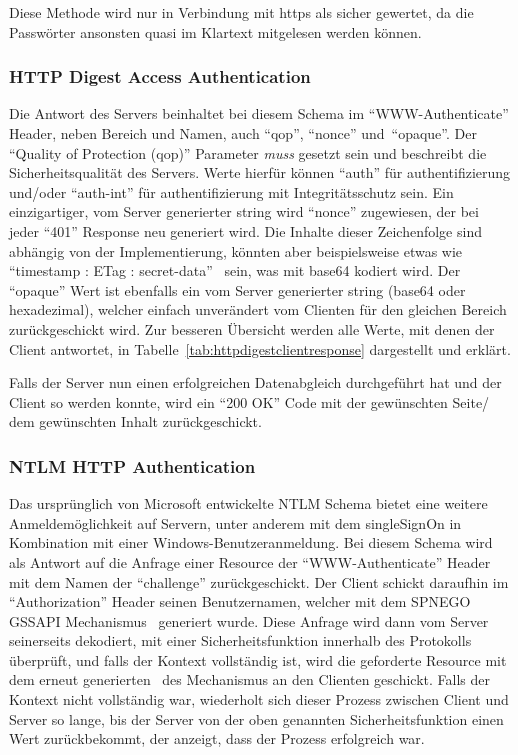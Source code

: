		Diese Methode wird nur in Verbindung mit \gls{https} als sicher gewertet,
		da die Passwörter ansonsten quasi im Klartext mitgelesen werden können.

	\subsubsection{HTTP Digest Access Authentication}\label{subsubsec:http-digest-access-authentication}
		Die Antwort des Servers beinhaltet bei diesem Schema im \enquote{WWW-Authenticate} Header,
		neben Bereich und Namen,
		auch \enquote{qop}, \enquote{nonce} und~\enquote{opaque}.
		Der \enquote{Quality of Protection (qop)} Parameter \textit{muss} gesetzt sein und
		beschreibt die Sicherheitsqualität des Servers.
		Werte hierfür können \enquote{auth} für \gls{authentifizierung} und/oder
		\enquote{auth-int} für \gls{authentifizierung} mit Integritätsschutz sein.
		Ein einzigartiger, vom Server generierter \gls{string} wird \enquote{nonce} zugewiesen,
		der bei jeder \enquote{401} Response neu generiert wird.
		Die Inhalte dieser Zeichenfolge sind abhängig von der Implementierung,
		könnten aber beispielsweise etwas wie
		\enquote{timestamp : ETag : secret-data}~\cite[Vgl.][]{rfc7616} sein,
		was mit \gls{base64} kodiert wird.
		Der \enquote{opaque} Wert ist ebenfalls ein vom Server generierter
		\gls{string} (\gls{base64} oder hexadezimal),
		welcher einfach unverändert vom Clienten für den gleichen Bereich zurückgeschickt wird.
		Zur besseren Übersicht werden alle Werte,
		mit denen der Client antwortet,
		in Tabelle~\ref{tab:httpdigestclientresponse} dargestellt und erklärt.

		Falls der Server nun einen erfolgreichen Datenabgleich durchgeführt hat
		und der Client so  werden konnte,
		wird ein \enquote{200 OK} Code mit der gewünschten Seite/
		dem gewünschten Inhalt zurückgeschickt.

	\subsubsection{NTLM HTTP Authentication}\label{subsubsec:ntlm-http-authentication}
		Das ursprünglich von Microsoft entwickelte NTLM Schema bietet eine weitere Anmeldemöglichkeit auf Servern,
		unter anderem mit dem \gls{singleSignOn} in Kombination mit einer Windows-Benutzeranmeldung.
		Bei diesem Schema wird als Antwort auf die Anfrage einer Resource
		der \enquote{WWW-Authenticate} Header mit dem Namen der \enquote{challenge} zurückgeschickt.
		Der Client schickt daraufhin im \enquote{Authorization} Header seinen Benutzernamen,
		welcher mit dem SPNEGO GSSAPI Mechanismus~\cite[Vgl.][]{rfc4178} generiert wurde.
		Diese Anfrage wird dann vom Server seinerseits dekodiert,
		mit einer Sicherheitsfunktion innerhalb des Protokolls überprüft,
		und falls der Kontext vollständig ist,
		wird die geforderte Resource mit dem erneut generierten~
		des Mechanismus an den Clienten geschickt.
		Falls der Kontext nicht vollständig war,
		wiederholt sich dieser Prozess zwischen Client und Server so lange,
		bis der Server von der oben genannten Sicherheitsfunktion einen Wert zurückbekommt,
		der anzeigt,
		dass der Prozess erfolgreich war.
